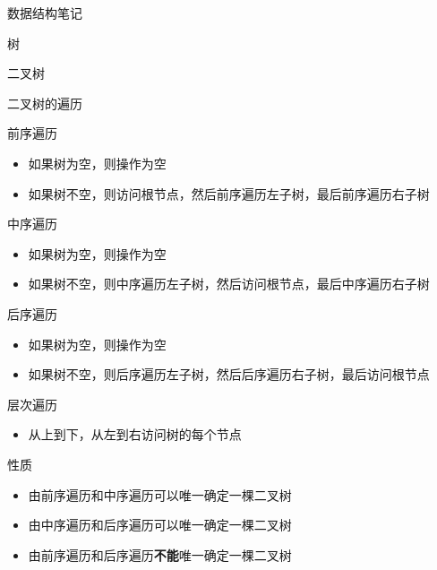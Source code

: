 \documentclass[
  ignorenonframetext,
]{beamer}
\providecommand{\tightlist}{%
  \setlength{\itemsep}{0pt}\setlength{\parskip}{0pt}}
\begin{document}
\begin{frame}[fragile]{数据结构笔记}
\begin{block}{树}
\begin{block}{二叉树}
\begin{block}{二叉树的遍历}
\protect{}\label{ux4e8cux53c9ux6811ux7684ux904dux5386}
\begin{block}{前序遍历}
\protect{}\label{ux524dux5e8fux904dux5386}
\begin{itemize}
\tightlist
\item
  如果树为空，则操作为空
\item
  如果树不空，则访问根节点，然后前序遍历左子树，最后前序遍历右子树
\end{itemize}
\end{block}

\begin{block}{中序遍历}
\protect{}\label{ux4e2dux5e8fux904dux5386}
\begin{itemize}
\tightlist
\item
  如果树为空，则操作为空
\item
  如果树不空，则中序遍历左子树，然后访问根节点，最后中序遍历右子树
\end{itemize}
\end{block}

\begin{block}{后序遍历}
\protect{}\label{ux540eux5e8fux904dux5386}
\begin{itemize}
\tightlist
\item
  如果树为空，则操作为空
\item
  如果树不空，则后序遍历左子树，然后后序遍历右子树，最后访问根节点
\end{itemize}
\end{block}

\begin{block}{层次遍历}
\protect{}\label{ux5c42ux6b21ux904dux5386}
\begin{itemize}
\tightlist
\item
  从上到下，从左到右访问树的每个节点
\end{itemize}
\end{block}

\begin{block}{性质}
\protect{}\label{ux6027ux8d28}
\begin{itemize}
\tightlist
\item
  由前序遍历和中序遍历可以唯一确定一棵二叉树
\item
  由中序遍历和后序遍历可以唯一确定一棵二叉树
\item
  由前序遍历和后序遍历\textbf{不能}唯一确定一棵二叉树
\end{itemize}
\end{block}
\end{block}


\end{block}
\end{block}
\end{frame}
\end{document}
